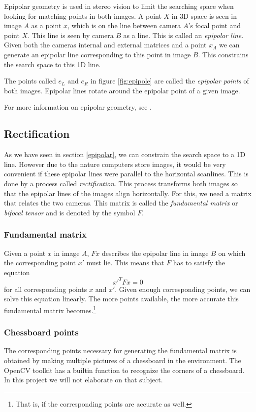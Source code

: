\documentclass[a4paper]{article}
\begin{document}
Epipolar geometry is used in stereo vision to limit the searching space when
looking for matching points in both images. A point $X$ in 3D space is seen in
image $A$ as a point $x$, which is on the line between camera $A$'s focal point
and point $X$. This line is seen by camera $B$ as a line. This is called an
\emph{epipolar line}. Given both the cameras internal and external matrices and
a point $x_A$ we can generate an epipolar line corresponding to this point in
image $B$. This constrains the search space to this 1D line.

The points called $e_{L}$ and $e_{R}$ in figure \ref{fig:epipole} are called the
\emph{epipolar points} of both images. Epipolar lines rotate around the epipolar
point of a given image.

For more information on epipolar geometry, see \cite{Hartley2004}.

\subsection{Rectification}
\label{rectification}
As we have seen in section \ref{epipolar}, we can constrain the search space to
a 1D line. However due to the nature computers store images, it would be very
convenient if these epipolar lines were parallel to the horizontal scanlines.
This is done by a process called \emph{rectification}. This process transforms
both images so that the epipolar lines of the images align horizontally. For
this, we need a matrix that relates the two cameras. This matrix is called the
\emph{fundamental matrix} or \emph{bifocal tensor} and is denoted by the symbol
$F$.

\subsubsection{Fundamental matrix}
Given a point $x$ in image $A$, $Fx$ describes the epipolar line in image
$B$ on which the corresponding point $x'$ must lie. This means that $F$ has to
satisfy the equation
\[ x'^{T}Fx = 0 \]
for all corresponding points $x$ and $x'$. Given enough corresponding points, we
can solve this equation linearly. The more points available, the more accurate
this fundamental matrix becomes.\footnote{That is, if the corresponding points
are accurate as well.}

\subsubsection{Chessboard points}
The corresponding points necessary for generating the fundamental matrix is
obtained by making multiple pictures of a chessboard in the environment. The
OpenCV toolkit has a builtin function to recognize the corners of a chessboard.
In this project we will not elaborate on that subject.
\end{document}

